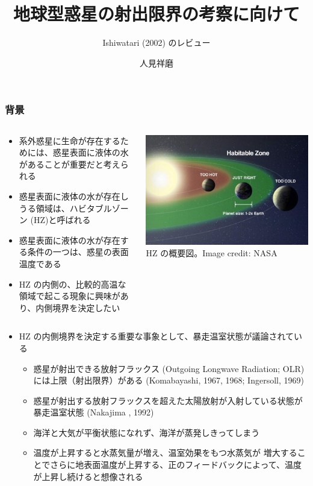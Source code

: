 \documentclass[aspectratio=149,9pt,]{beamer}
\institute{北海道大学大学院理学院 地球流体力学研究室 M2}
\author{人見祥磨}
\title{地球型惑星の射出限界の考察に向けて}
\subtitle{Ishiwatari \etal (2002) のレビュー}
\begin{document}
\maketitle

\begin{frame}
	\frametitle{背景}
	\begin{columns}[T,onlytextwidth]
		\begin{column}{.6\textwidth}
			\begin{itemize}
				\item 系外惑星に生命が存在するためには、惑星表面に液体の水があることが重要だと考えられる
				\item 惑星表面に液体の水が存在しうる領域は、ハビタブルゾーン (HZ)と呼ばれる
				\item 惑星表面に液体の水が存在する条件の一つは、惑星の表面温度である
				\item HZ の内側の、比較的高温な領域で起こる現象に興味があり、内側境界を決定したい
			\end{itemize}
		\end{column}
		\begin{column}{.35\textwidth}
			\centering
			\includegraphics[width=\textwidth]{hz.jpg}\\
			\scriptsize HZ の概要図。Image credit: NASA
		\end{column}
	\end{columns}
	\begin{itemize}
		\item HZ の内側境界を決定する重要な事象として、暴走温室状態が議論されている
			\begin{itemize}
				\item 惑星が射出できる放射フラックス (Outgoing Longwave Radiation; OLR)
					には上限（射出限界）がある (Komabayashi, 1967, 1968; Ingersoll, 1969)
				\item 惑星が射出する放射フラックスを超えた太陽放射が入射している状態が
					暴走温室状態 (Nakajima \etal*, 1992)
				\item 海洋と大気が平衡状態になれず、海洋が蒸発しきってしまう
				\item 温度が上昇すると水蒸気量が増え、温室効果をもつ水蒸気が
					増大することでさらに地表面温度が上昇する、正のフィードバックによって、温度
					が上昇し続けると想像される
			\end{itemize}
	\end{itemize}
\end{frame}
\end{document}

